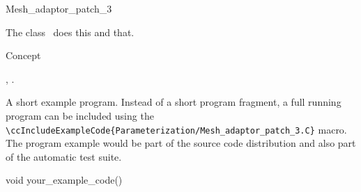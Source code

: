 

\begin{ccRefClass}{Mesh_adaptor_patch_3}  %


\ccDefinition
  
The class \ccRefName\ does this and that.


\ccIsModel

Concept

\ccTypes


\ccCreation
{}  %


\ccOperations


\ccSeeAlso

,
.

\ccExample

A short example program.
Instead of a short program fragment, a full running program can be
included using the 
\verb|\ccIncludeExampleCode{Parameterization/Mesh_adaptor_patch_3.C}| 
macro. The program example would be part of the source code distribution and
also part of the automatic test suite.

\begin{ccExampleCode}
void your_example_code() {
}
\end{ccExampleCode}


\end{ccRefClass}


